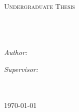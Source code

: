 \documentclass[
12pt, %
english, %
singlespacing, %
headsepline, %
]{MastersDoctoralThesis} %
\author{{Md.Mostafizur  \textsc{Rahman}}  {Sabid Bin Habib}} %
\begin{document}
\frontmatter %

\pagestyle{plain} %


\begin{titlepage}
\begin{center}

\textsc{\LARGE \univname}\\[1.5cm] %
\textsc{\Large Undergraduate Thesis}\\[0.5cm] %

\HRule \\[0.4cm] %
{\huge \bfseries \ttitle}\\[0.4cm] %
\HRule \\[1.5cm] %
 
\begin{minipage}{0.4\textwidth}
\begin{flushleft} \large
\emph{Author:}\\
{\authorname} %
\end{flushleft}
\end{minipage}
\begin{minipage}{0.4\textwidth}
\begin{flushright} \large
\emph{Supervisor:} \\
{\supname} %
\end{flushright}
\end{minipage}\\[3cm]
 
\deptname\\[2cm] %
 
{\large \today}\\[4cm] %
 
\vfill
\end{center}
\end{titlepage}

\end{document}
